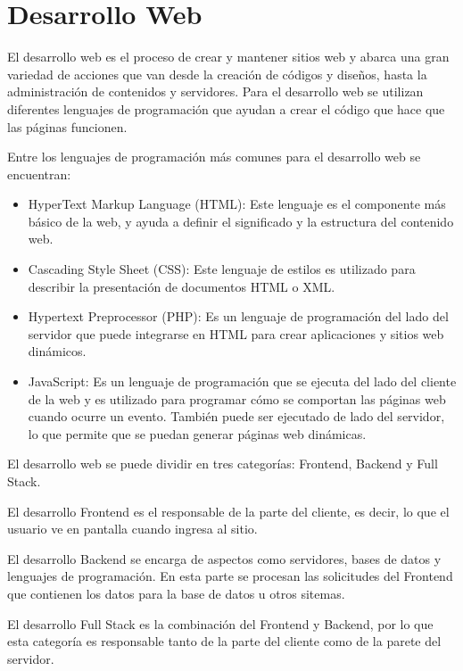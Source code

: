 \section{Desarrollo Web}
El desarrollo web es el proceso de crear y mantener sitios web y abarca una gran variedad de acciones que van desde la creación de códigos y diseños, hasta la administración de contenidos y servidores. Para el desarrollo web se utilizan diferentes lenguajes de programación que ayudan a crear el código que hace que las páginas funcionen.

Entre los lenguajes de programación más comunes para el desarrollo web se encuentran:
    \begin{itemize}
        \item HyperText Markup Language (HTML): Este lenguaje es el componente más básico de la web, y ayuda a definir el significado y la estructura del   contenido web.
        \item Cascading Style Sheet (CSS): Este lenguaje de estilos es utilizado para describir la presentación de documentos HTML o XML.
        \item Hypertext Preprocessor (PHP): Es un lenguaje de programación del lado del servidor que puede integrarse en HTML para crear aplicaciones y sitios web dinámicos.
        \item JavaScript: Es un lenguaje de programación que se ejecuta del lado del cliente de la web y es utilizado para programar cómo se comportan las páginas web cuando ocurre un evento. También puede ser ejecutado de lado del servidor, lo que permite que se puedan generar páginas web dinámicas.
    \end{itemize}
El desarrollo web se puede dividir en tres categorías: Frontend, Backend y Full Stack.

El desarrollo Frontend es el responsable de la parte del cliente, es decir, lo que el usuario ve en pantalla cuando ingresa al sitio.

El desarrollo Backend se encarga de aspectos como servidores, bases de datos y lenguajes de programación. En esta parte se procesan las solicitudes del Frontend que contienen los datos para la base de datos u otros sitemas.

El desarrollo Full Stack es la combinación del Frontend y Backend, por lo que esta categoría es responsable tanto de la parte del cliente como de la parete del servidor.
